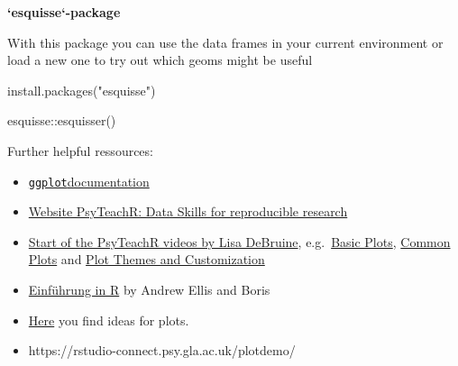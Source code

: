 \documentclass[
  letterpaper,
  DIV=11,
  numbers=noendperiod,
  oneside]{scrreprt}
\newenvironment{Shaded}{\begin{snugshade}}{\end{snugshade}}
\newcommand{\FunctionTok}[1]{\textcolor[rgb]{0.28,0.35,0.67}{#1}}
\newcommand{\NormalTok}[1]{\textcolor[rgb]{0.00,0.23,0.31}{#1}}
\newcommand{\SpecialCharTok}[1]{\textcolor[rgb]{0.37,0.37,0.37}{#1}}
\newcommand{\StringTok}[1]{\textcolor[rgb]{0.13,0.47,0.30}{#1}}
\begin{document}
\begin{tcolorbox}[enhanced jigsaw, colframe=quarto-callout-tip-color-frame, bottomrule=.15mm, left=2mm, arc=.35mm, toprule=.15mm, opacityback=0, colback=white, rightrule=.15mm, breakable, leftrule=.75mm]
\begin{minipage}[t]{5.5mm}
\textcolor{quarto-callout-tip-color}{\faLightbulb}
\end{minipage}%
\begin{minipage}[t]{\textwidth - 5.5mm}

\textbf{`esquisse`-package}\vspace{2mm}

With this package you can use the data frames in your current
environment or load a new one to try out which geoms might be useful

\begin{Shaded}
\begin{Highlighting}[]
\FunctionTok{install.packages}\NormalTok{(}\StringTok{"esquisse"}\NormalTok{)}

\NormalTok{esquisse}\SpecialCharTok{::}\FunctionTok{esquisser}\NormalTok{() }
\end{Highlighting}
\end{Shaded}

\end{minipage}%
\end{tcolorbox}

Further helpful ressources:

\begin{itemize}
\item
  \href{https://ggplot2.tidyverse.org/}{\texttt{ggplot}documentation}
\item
  \href{https://psyteachr.github.io/reprores-v3}{Website PsyTeachR: Data
  Skills for reproducible research}
\item
  \href{https://youtu.be/90IdULVGmYY}{Start of the PsyTeachR videos by
  Lisa DeBruine}, e.g.~\href{https://youtu.be/tOFQFPRgZ3M}{Basic Plots},
  \href{https://youtu.be/kKlQupjD__g}{Common Plots} and
  \href{https://youtu.be/6pHuCbOh86s}{Plot Themes and Customization}
\item
  \href{https://methodenlehre.github.io/einfuehrung-in-R/chapters/05-plotting.html}{Einführung
  in R} by Andrew Ellis and Boris
\item
  \href{https://www.data-to-viz.com}{Here} you find ideas for plots.
\item
  https://rstudio-connect.psy.gla.ac.uk/plotdemo/
\end{itemize}
\end{document}
